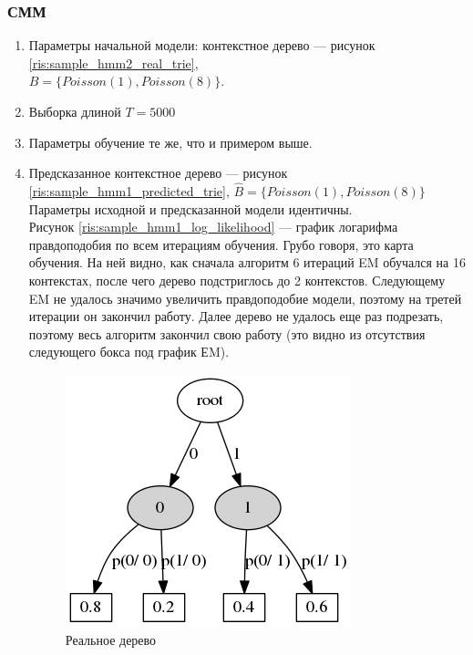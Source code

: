 \documentclass{matmex-diploma-custom}
\begin{document}
\subsubsection{СММ}

\begin{enumerate}
\item Параметры начальной модели: контекстное дерево --- рисунок \ref{ris:sample_hmm2_real_trie}, 
\\$B = \{\textit{Poisson}(1), \textit{Poisson}(8)\}$. 
\item Выборка длиной $ T = 5000 $
\item Параметры обучение те же, что и примером выше.      
\item Предсказанное контекстное дерево --- рисунок \ref{ris:sample_hmm1_predicted_trie}, 
$\hat{B} = \{\textit{Poisson}(1), \textit{Poisson}(8)\}$
\\Параметры исходной и предсказанной модели идентичны.
\\Рисунок \ref{ris:sample_hmm1_log_likelihood} --- график логарифма правдоподобия по всем итерациям обучения. Грубо говоря, это карта обучения. На ней видно, как сначала алгоритм 6 итераций EM обучался на 16 контекстах, после чего дерево подстриглось до 2 контекстов. Следующему EM не удалось значимо увеличить правдоподобие модели, поэтому на третей итерации он закончил работу. Далее дерево не удалось еще раз подрезать, поэтому весь алгоритм закончил свою работу (это видно из отсутствия следующего бокса под график ЕM).
\begin{figure}[h!]\centering
\begin{minipage}[b]{0.49 \textwidth}
	\includegraphics[scale=0.4]{img/sample_hmm1/real_trie_.png}
	\centering
	\caption{ Реальное дерево }
	\label{ris:sample_hmm1_real_trie}
\end{minipage}
\hfil \hfil%

\end{figure}
\end{enumerate}
\end{document}
